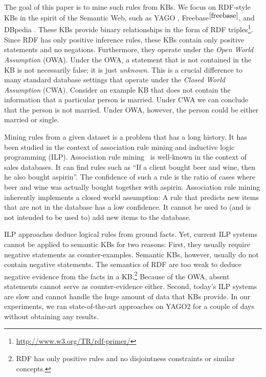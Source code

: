 The goal of this paper is to mine such rules from KBs. 
We focus on RDF-style KBs in the spirit of the Semantic Web, such as YAGO \cite{SucKasWei07}, Freebase$^{\ref{freebase}}$, and DBpedia \cite{dbpedia}. These KBs provide binary relationships in the form of RDF triples\footnote{\url{http://www.w3.org/TR/rdf-primer/}}. Since RDF has only positive inference rules, these KBs contain only positive statements and no negations.
Furthermore, they 
operate under the \emph{Open World Assumption} (OWA). Under the OWA, a statement that is not contained in the KB is not necessarily false; it is just \emph{unknown}. 
This is a crucial difference to many standard database settings that operate under the \emph{Closed World Assumption} (CWA). 
Consider an example KB that does not contain the information that a particular person is married. Under CWA we can conclude that the person is not married. Under OWA, however, the person could be either married or single.


Mining rules from a given dataset is a problem that has a long history. It has been studied in the context of association rule mining and inductive logic programming (ILP). Association rule mining~\cite{AgrImiSwa93} is well-known in the context of sales databases. It can find rules such as ``If a client bought beer and wine, then he also bought aspirin''. 
The confidence of such a rule is the ratio of cases where beer and wine was actually bought together with aspirin. Association rule mining inherently implements a closed world assumption: A rule that predicts new items that are not in the database has a low confidence. It cannot be used to (and is not intended to be used to) add new items to the database.

ILP approaches deduce logical rules 
from ground facts. Yet, current ILP systems cannot be applied to semantic KBs for two reasons: First, they usually require negative statements as counter-examples. 
Semantic KBs, however, usually do not contain negative statements. The semantics of RDF are too weak to deduce negative evidence from the facts in a KB.\footnote{RDF has only positive rules and no disjointness constraints or similar concepts.} Because of the OWA, absent statements cannot serve as counter-evidence either.
Second, today's ILP systems are slow and cannot handle the huge amount of data that KBs provide. In our experiments, we ran state-of-the-art approaches on YAGO2 for a couple of days without obtaining any results. 

